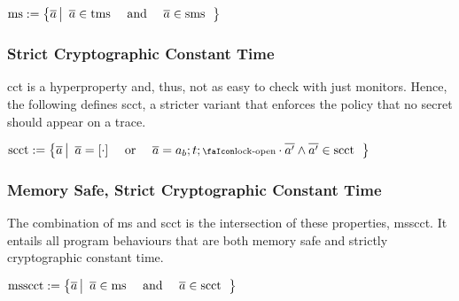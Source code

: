 \documentclass[utf8,acmsmall,review,screen,dvipsnames]{acmart}
\begin{document}
\begin{definition}[\glsfirst{ms}]\label{def:trace:msdef}
  $
  \operatorname{ms}:=\left\{\overline{a} \left|\begin{array}{rcl}
                                 \overline{a}\in\operatorname{tms} & \text{ and } & \overline{a}\in\operatorname{sms}
                               \end{array}\right.\right\}
  $
\end{definition}


\subsubsection{Strict Cryptographic Constant Time}

\gls{cct} is a hyperproperty and, thus, not as easy to check with just monitors. %
Hence, the following defines \gls{scct}, a stricter variant that enforces the policy that no secret should appear on a trace.

\begin{definition}\label{def:trace:scctdef}
  $
  \scctsafe:=\left\{\trace \left|\begin{array}{rcl}
                                   \trace=\hole{\cdot} & \text{ or } & \trace=\event[_{b}];\sandboxtag;\unlock\cdot\trace['] \wedge \trace[']\in\scctsafe
                                 \end{array}\right.\right\}
  $
\end{definition}

\subsubsection{Memory Safe, Strict Cryptographic Constant Time}

The combination of \gls{ms} and \gls{scct} is the intersection of these properties, \gls{msscct}.
It entails all program behaviours that are both memory safe and strictly cryptographic constant time.

\begin{definition}\label{def:trace:msscctdef}
  $
  \operatorname{msscct}:=\left\{\overline{a} \left| \begin{array}{rcl}
                                      \overline{a}\in\operatorname{ms} & \text{ and } & \overline{a}\in\operatorname{scct}
                                    \end{array}\right.\right\}
  $
\end{definition}

\end{document}
